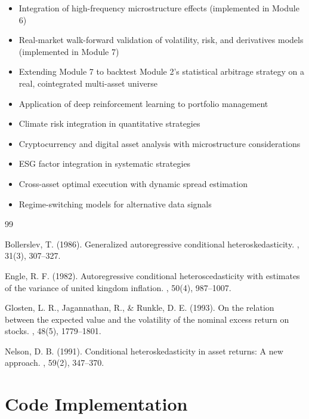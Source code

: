 \documentclass[12pt,a4paper]{article}
\begin{document}
\begin{itemize}
    \item Integration of high-frequency microstructure effects (implemented in Module 6)
    \item Real-market walk-forward validation of volatility, risk, and derivatives models (implemented in Module 7)
    \item Extending Module 7 to backtest Module 2's statistical arbitrage strategy on a real, cointegrated multi-asset universe
    \item Application of deep reinforcement learning to portfolio management
    \item Climate risk integration in quantitative strategies
    \item Cryptocurrency and digital asset analysis with microstructure considerations
    \item ESG factor integration in systematic strategies
    \item Cross-asset optimal execution with dynamic spread estimation
    \item Regime-switching models for alternative data signals
\end{itemize}


\begin{thebibliography}{99}

Bollerslev, T. (1986).
\newblock Generalized autoregressive conditional heteroskedasticity.
, 31(3), 307--327.

Engle, R. F. (1982).
\newblock Autoregressive conditional heteroscedasticity with estimates of the variance of united kingdom inflation.
, 50(4), 987--1007.

Glosten, L. R., Jagannathan, R., \& Runkle, D. E. (1993).
\newblock On the relation between the expected value and the volatility of the nominal excess return on stocks.
, 48(5), 1779--1801.

Nelson, D. B. (1991).
\newblock Conditional heteroskedasticity in asset returns: A new approach.
, 59(2), 347--370.

\end{thebibliography}

\appendix

\section{Code Implementation}
\end{document}
